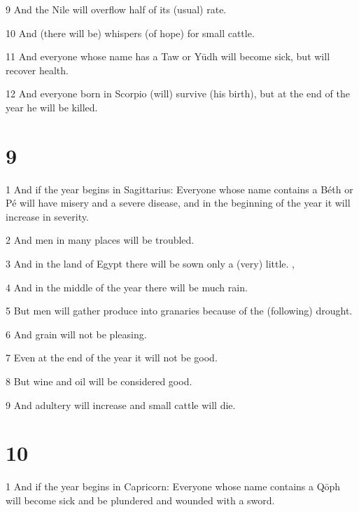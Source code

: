 \par 9 And the Nile will overflow half of its (usual) rate.

\par 10 And (there will be) whispers (of hope) for small cattle. 

\par 11 And everyone whose name has a Taw or Yūdh will become sick, but will recover health. 

\par 12 And everyone born in Scorpio (will) survive (his birth), but at the end of 
the year he will be killed. 

\chapter{9}

\par 1 And if the year begins in Sagittarius: Everyone whose name contains a Béth or Pé will have misery and a severe disease, and in the beginning of the year it will increase in severity. 

\par 2 And men in many places will be troubled. 

\par 3 And in the land of Egypt there will be sown only a (very) little. ,

\par 4 And in the middle of the year there will be much rain. 

\par 5 But men will gather produce into granaries because of the (following) drought. 

\par 6 And grain will not be pleasing. 

\par 7 Even at the end of the year it will not be good.

\par 8 But wine and oil will be considered good. 

\par 9 And adultery will increase and small cattle will die. 

\chapter{10}

\par 1 And if the year begins in Capricorn: Everyone whose name contains a Qōph will become sick and be plundered and wounded with a sword. 

